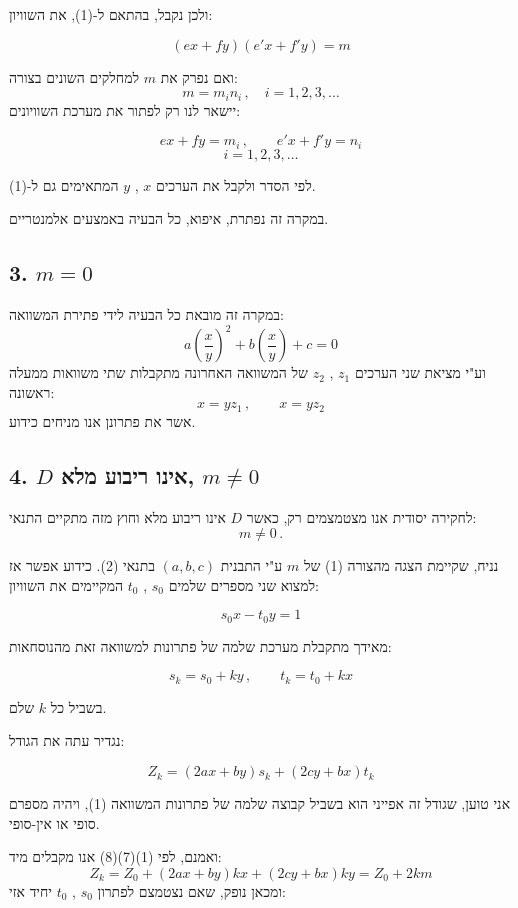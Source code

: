 \noindent ולכן נקבל, בהתאם ל-(1), את השוויון:

\[ (ex + fy)(e'x + f'y) = m \tag{4} \]

\noindent ואם נפרק את $m$ למחלקים השונים בצורה:
\[ m = m_i n_i \, , \quad i = 1 , 2 , 3 , \ldots \]
\noindent יישאר לנו רק לפתור את מערכת השוויונים:

\[ ex + fy = m_i \, , \qquad e'x + f'y = n_i \tag{5} \]
\[ i = 1 , 2 , 3 , \ldots \]

\noindent לפי הסדר ולקבל את הערכים $x$ , $y$ המתאימים גם ל-(1).

\noindent במקרה זה נפתרת, איפוא, כל הבעיה באמצעים אלמנטריים.

\bigskip
\subsection*{3. $m = 0$}

\noindent במקרה זה מובאת כל הבעיה לידי פתירת המשוואה:
\[ a\left(\frac{x}{y}\right)^2 + b\left(\frac{x}{y}\right) + c = 0 \]
\noindent וע"י מציאת שני הערכים $z_1$ , $z_2$ של המשוואה האחרונה מתקבלות שתי משוואות ממעלה ראשונה:
\[ x = yz_1 \, , \qquad x = yz_2 \]
\noindent אשר את פתרונן אנו מניחים כידוע.

\bigskip
\subsection*{4. $D$ אינו ריבוע מלא, $m \neq 0$}

\noindent לחקירה יסודית אנו מצטמצמים רק, כאשר $D$ אינו ריבוע מלא וחוץ מזה מתקיים התנאי:
\[ m \neq 0 \, . \]

\noindent נניח, שקיימת הצגה מהצורה (1) של $m$ ע"י התבנית $(a,b,c)$ בתנאי (2). כידוע אפשר אז למצוא שני מספרים שלמים $s_0$ , $t_0$ המקיימים את השוויון:

\[ s_0 x - t_0 y = 1 \tag{6} \]

\noindent מאידך מתקבלת מערכת שלמה של פתרונות למשוואה זאת מהנוסחאות:

\[ s_k = s_0 + ky \, , \qquad t_k = t_0 + kx \tag{7} \]

\noindent בשביל כל $k$ שלם.

\noindent נגדיר עתה את הגודל:

\[ Z_k = (2ax+by)s_k + (2cy+bx)t_k \tag{8} \]

\noindent אני טוען, שגודל זה אפייני הוא בשביל קבוצה שלמה של פתרונות המשוואה (1), ויהיה מספרם סופי או אין-סופי.

\noindent ואמנם, לפי (1)(7)(8) אנו מקבלים מיד:
\[ Z_k = Z_0 + (2ax+by)kx + (2cy+bx)ky = Z_0 + 2km \]
\noindent ומכאן נופק, שאם נצטמצם לפתרון $s_0$ , $t_0$ יחיד אזי:

